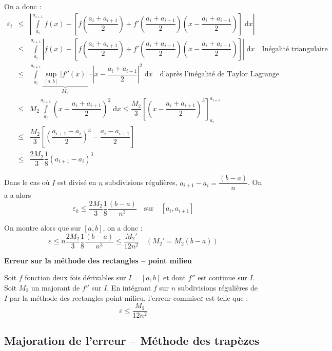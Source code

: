 \documentclass[10pt]{article}
\begin{document}
  On a donc :  
\begin{eqnarray*}
\varepsilon_i & \leq &\left|
\int\limits_{a_i}^{a_{i+1}} f(x) - \left[
f\left(\dfrac{a_i+a_{i+1}}{2} \right)
+f'\left(\dfrac{a_i+a_{i+1}}{2} \right)\left(x - \dfrac{a_i+a_{i+1}}{2}\right)
\right] \; \mathrm{d}x\right| \\
& \leq & \int\limits_{a_i}^{a_{i+1}} \left|f(x) - \left[
f\left(\dfrac{a_i+a_{i+1}}{2} \right)
+f'\left(\dfrac{a_i+a_{i+1}}{2} \right)\left(x - \dfrac{a_i+a_{i+1}}{2}\right)
\right] \right|\; \mathrm{d}x \quad \text{Inégalité triangulaire}\\
& \leq & \int\limits_{a_i}^{a_{i+1}} \underbrace{\underset{[a,b]}{\sup} \left| f''(x)\right|}_{M_2} \cdot \left| x- \dfrac{a_i+a_{i+1}}{2}\right|^2  \; \mathrm{d}x \quad \text{d'après l'inégalité de Taylor Lagrange}\\
& \leq & M_2 \int\limits_{a_i}^{a_{i+1}} \left( x- \dfrac{a_i+a_{i+1}}{2}\right)^2  \; \mathrm{d}x \leq \dfrac{M_2}{3} \left[ \left( x- \dfrac{a_i+a_{i+1}}{2}\right)^3\right]_{a_i}^{a_{i+1}} \\
& \leq & \dfrac{M_2}{3} \left[ \left( \dfrac{a_{i+1}-a_{i}}{2} \right)^3- \dfrac{a_i-a_{i+1}}{2}\right]\\
& \leq & \dfrac{2M_2}{3}\dfrac{1}{8}\left( {a_{i+1}-a_{i}}\right)^3
\end{eqnarray*}


Dans le cas où $I$ est divisé en $n$ subdivisions régulières, $a_{i+1}-a_i = \dfrac{(b-a)}{n}$. On a a alors 
$$
\varepsilon_k \leq \dfrac{2M_2}{3}\dfrac{1}{8}\dfrac{(b-a)}{n^3} \quad \text{sur}\quad [a_i,a_{i+1}]
$$

On montre alors que sur $[a,b]$, on a donc :
$$
\varepsilon \leq n \dfrac{2M_2}{3}\dfrac{1}{8}\dfrac{(b-a)}{n^3} \leq \dfrac{M_2'}{12 n^2}
\quad
(M_2 ' = M_2 (b-a))
$$

\begin{resultat}
\textbf{Erreur sur la méthode des rectangles -- point milieu}

Soit $f$ fonction deux fois dérivables sur $I=[a,b]$ et dont $f''$ est continue sur $I$. Soit $M_2$ un majorant de $f''$ sur $I$. En intégrant $f$ sur $n$ subdivisions régulières de $I$ par la méthode des rectangles point milieu, l'erreur commise$\varepsilon$ est telle que : 
$$ \varepsilon \leq \dfrac{M_2}{12n^2}$$ 

\end{resultat}

\subsection{Majoration de l'erreur -- Méthode des trapèzes}
\end{document}
